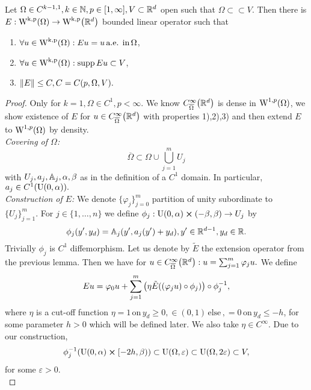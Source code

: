 \documentclass{article}
\begin{document}
\begin{theorem}
	Let $\Omega \in C^{k-1,1}, k \in {\mathbb N}, p \in [1,\infty], V \subset {\mathbb R}^d$ open such that $\Omega \subset \subset V.$ Then there is $E: \WkpSet{\Omega} \to \WkpSet{\R^d}$ bounded linear operator such that
	\begin{enumerate}
		\item $ \forall u \in \WkpSet{\Omega}: Eu=u \, \text{a.e. in} \, \Omega$,
		\item $ \forall u \in \WkpSet{\Omega}: \supp Eu \subset V$,
		\item $\norm{E} \leq C, C=C(p,\Omega,V).$
	\end{enumerate}
\end{theorem}

\begin{proof}
	Only for $k=1, \Omega \in C^1, p < \infty$. We know $C^{\infty}_{\overline{\Omega}}\qty({\mathbb R}^d)$ is dense in $\WkpSet[1][p]{\Omega}$, we show existence of $E$ for $u \in C^{\infty}_{\overline{\Omega}}\qty({\mathbb R}^d)$ with properties 1),2),3) and then extend $E$ to $\WkpSet[1][p]{\Omega}$ by density.
	\\
	\textit{Covering of $\Omega$:}
	\[
		\overline{\Omega} \subset \Omega \cup \bigcup_{j=1}^m U_j
	\]
	with $U_j,a_j, \mathbb{A}_j, \alpha, \beta$ as in the definition of a $C^1$ domain. In particular, $a_j \in C^1\qty(\text{U}(0,\alpha)).$
	\\
	\textit{Construction of $E$:}
	We denote $\{\varphi_j \}_{j=0}^m$ partition of unity subordinate to $\{U_j\}_{j=1}^m.$ For $j \in \{1, \dots, n\}$ we define $\phi_j : \text{U}(0,\alpha) \cross (-\beta,\beta) \to U_j$ by
	\[
		\phi_j\qty(y',y_d) = \mathbb{A}_j (y', a_j(y') + y_d), y' \in {\mathbb R}^{d-1}, y_d \in {\mathbb R}.
	\]
	Trivially $\phi_j$ is $C^1$ diffemorphism. Let us denote by $\tilde{E}$ the extension operator from the previous lemma. Then we have for $u \in C^{\infty}_{\overline{\Omega}}\qty({\mathbb R}^d): u = \sum_{j=1}^m \varphi_j u.$ We define
	\[
		Eu=\varphi_0 u + \sum_{j=1}^m \qty(\eta \tilde{E}\qty((\varphi_j u) \circ \phi_j)) \circ \phi_j^{-1},
	\]
	where $\eta$ is a cut-off function $\eta = 1 \, \text{on} \, y_d \geq 0, \in (0,1) \, \text{else} \,, =0 \, \text{on} \, y_d \leq -h$, for some parameter $h>0$ which will be defined later. We also take $\eta \in C^\infty$. Due to our construction,
	\[
		\phi_j^{-1} \qty(\text{U}(0,\alpha) \cross [-2h, \beta)) \subset \text{U}(\Omega,\varepsilon) \subset \text{U}(\Omega,2 \varepsilon) \subset V,  
	\]
	for some $\varepsilon>0.$
	\\

\end{proof}
\end{document}
